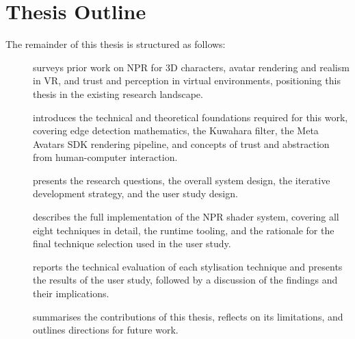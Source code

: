 \section{Thesis Outline}
\label{sec:outline}

The remainder of this thesis is structured as follows:

\begin{description}
  \item[] surveys prior work on NPR for 3D characters, avatar rendering and realism in VR, and trust and perception in virtual environments, positioning this thesis in the existing research landscape.

  \item[] introduces the technical and theoretical foundations required for this work, covering edge detection mathematics, the Kuwahara filter, the Meta Avatars SDK rendering pipeline, and concepts of trust and abstraction from human-computer interaction.

  \item[] presents the research questions, the overall system design, the iterative development strategy, and the user study design.

  \item[] describes the full implementation of the NPR shader system, covering all eight techniques in detail, the runtime tooling, and the rationale for the final technique selection used in the user study.

  \item[] reports the technical evaluation of each stylisation technique and presents the results of the user study, followed by a discussion of the findings and their implications.

  \item[] summarises the contributions of this thesis, reflects on its limitations, and outlines directions for future work.
\end{description}
